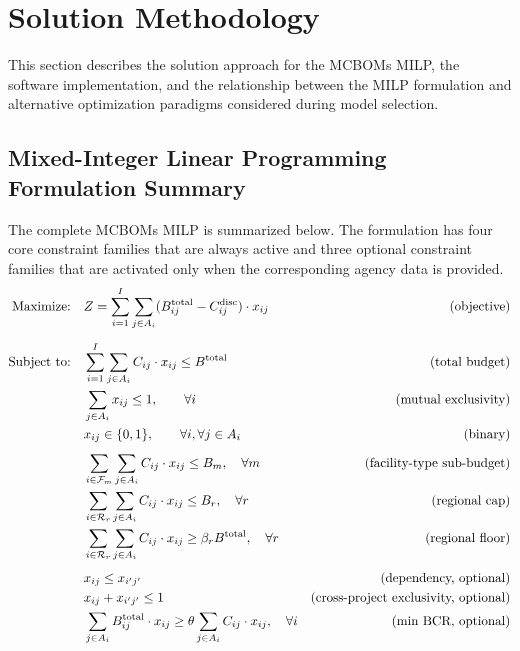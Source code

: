 \section{Solution Methodology}
\label{sec:solution}

This section describes the solution approach for the MCBOMs MILP, the
software implementation, and the relationship between the MILP formulation
and alternative optimization paradigms considered during model selection.

\subsection{Mixed-Integer Linear Programming Formulation Summary}
\label{sec:milp-summary}

The complete MCBOMs MILP is summarized below. The formulation has four
core constraint families that are always active and three optional
constraint families that are activated only when the corresponding agency
data is provided.
\begin{equation*}
\begin{aligned}
\text{Maximize:}\quad & Z = \sum_{i=1}^{I} \sum_{j \in A_i} (B^{\mathrm{total}}_{ij} - C_{ij}^{\mathrm{disc}}) \cdot x_{ij} & \text{(objective)} \\[6pt]
\text{Subject to:}\quad
& \sum_{i=1}^{I} \sum_{j \in A_i} C_{ij} \cdot x_{ij} \leq B^{\mathrm{total}} & \text{(total budget)} \\
& \sum_{j \in A_i} x_{ij} \leq 1, \qquad \forall i & \text{(mutual exclusivity)} \\
& x_{ij} \in \{0, 1\}, \qquad \forall i, \forall j \in A_i & \text{(binary)} \\[4pt]
& \sum_{i \in \mathcal{F}_m} \sum_{j \in A_i} C_{ij} \cdot x_{ij} \leq B_m, \quad \forall m & \text{(facility-type sub-budget)} \\
& \sum_{i \in \mathcal{R}_r} \sum_{j \in A_i} C_{ij} \cdot x_{ij} \leq B_r, \quad \forall r & \text{(regional cap)} \\
& \sum_{i \in \mathcal{R}_r} \sum_{j \in A_i} C_{ij} \cdot x_{ij} \geq \beta_r B^{\mathrm{total}}, \quad \forall r & \text{(regional floor)} \\[4pt]
& x_{ij} \leq x_{i'j'} & \text{(dependency, optional)} \\
& x_{ij} + x_{i'j'} \leq 1 & \text{(cross-project exclusivity, optional)} \\
& \sum_{j \in A_i} B^{\mathrm{total}}_{ij} \cdot x_{ij} \geq \theta \sum_{j \in A_i} C_{ij} \cdot x_{ij}, \quad \forall i & \text{(min BCR, optional)} \\
\end{aligned}
\end{equation*}

